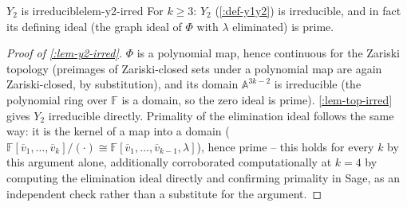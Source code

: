 \documentclass[a4paper,11pt]{scrartcl}
\begin{document}
\protect{}\label{fig-phi-y2}{}

\begin{lemma}{{}\(Y_{2}\) is irreducible}{lem-y2-irred} For \(k \geq 3\): \(Y_{2}\) (\cref{:def-y1y2}) is irreducible, and in fact its defining ideal (the graph ideal of \(\Phi\) with \(\lambda\) eliminated) is prime.

\end{lemma} \protect{}\label{lem-y2-irred}{}

\begin{proof}[Proof of \cref{:lem-y2-irred}] \(\Phi\) is a polynomial map, hence continuous for the Zariski topology (preimages of Zariski-closed sets under a polynomial map are again Zariski-closed, by substitution), and its domain \(\mathbb{A}^{3k - 2}\) is irreducible (the polynomial ring over \(\mathbb{F}\) is a domain, so the zero ideal is prime). \cref{:lem-top-irred} gives \(Y_{2}\) irreducible directly. Primality of the elimination ideal follows the same way: it is the kernel of a map into a domain (\(\mathbb{F}\left\lbrack {\overline{v}}_{1},\ldots,{\overline{v}}_{k} \right\rbrack/( \cdot ) \cong \mathbb{F}\left\lbrack {\overline{v}}_{1},\ldots,{\overline{v}}_{k - 1},\lambda \right\rbrack\)), hence prime -- this holds for every \(k\) by this argument alone, additionally corroborated computationally at \(k = 4\) by computing the elimination ideal directly and confirming primality in Sage, as an independent check rather than a substitute for the argument.

\end{proof}
\end{document}
